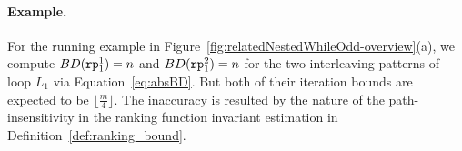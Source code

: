 \paragraph{Example.}
For the running example in Figure~\ref{fig:relatedNestedWhileOdd-overview}(a),
we compute $BD(\mathtt{rp}_1^1) = n$ and $BD(\mathtt{rp}_1^2) = n $ for the two interleaving patterns of loop $L_1$
via Equation~\ref{eq:absBD}.
But both of their iteration bounds are expected to be $\lfloor\frac{m}{4}\rfloor$.
The inaccuracy is resulted by the nature of the path-insensitivity in the ranking function invariant estimation in Definition~\ref{def:ranking_bound}. 

